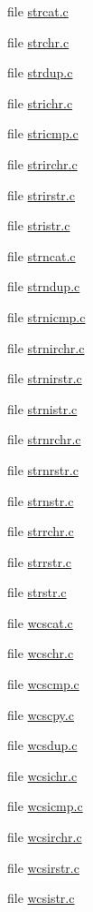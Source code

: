 \begin{DoxyCompactItemize}
file \hyperlink{strcat_8c}{strcat.\-c}
\item 
file \hyperlink{strchr_8c}{strchr.\-c}
\item 
file \hyperlink{strdup_8c}{strdup.\-c}
\item 
file \hyperlink{strichr_8c}{strichr.\-c}
\item 
file \hyperlink{stricmp_8c}{stricmp.\-c}
\item 
file \hyperlink{strirchr_8c}{strirchr.\-c}
\item 
file \hyperlink{strirstr_8c}{strirstr.\-c}
\item 
file \hyperlink{stristr_8c}{stristr.\-c}
\item 
file \hyperlink{strncat_8c}{strncat.\-c}
\item 
file \hyperlink{strndup_8c}{strndup.\-c}
\item 
file \hyperlink{strnicmp_8c}{strnicmp.\-c}
\item 
file \hyperlink{strnirchr_8c}{strnirchr.\-c}
\item 
file \hyperlink{strnirstr_8c}{strnirstr.\-c}
\item 
file \hyperlink{strnistr_8c}{strnistr.\-c}
\item 
file \hyperlink{strnrchr_8c}{strnrchr.\-c}
\item 
file \hyperlink{strnrstr_8c}{strnrstr.\-c}
\item 
file \hyperlink{strnstr_8c}{strnstr.\-c}
\item 
file \hyperlink{strrchr_8c}{strrchr.\-c}
\item 
file \hyperlink{strrstr_8c}{strrstr.\-c}
\item 
file \hyperlink{strstr_8c}{strstr.\-c}
\item 
file \hyperlink{wcscat_8c}{wcscat.\-c}
\item 
file \hyperlink{wcschr_8c}{wcschr.\-c}
\item 
file \hyperlink{wcscmp_8c}{wcscmp.\-c}
\item 
file \hyperlink{wcscpy_8c}{wcscpy.\-c}
\item 
file \hyperlink{wcsdup_8c}{wcsdup.\-c}
\item 
file \hyperlink{wcsichr_8c}{wcsichr.\-c}
\item 
file \hyperlink{wcsicmp_8c}{wcsicmp.\-c}
\item 
file \hyperlink{wcsirchr_8c}{wcsirchr.\-c}
\item 
file \hyperlink{wcsirstr_8c}{wcsirstr.\-c}
\item 
file \hyperlink{wcsistr_8c}{wcsistr.\-c}
\item 

\end{DoxyCompactItemize}
